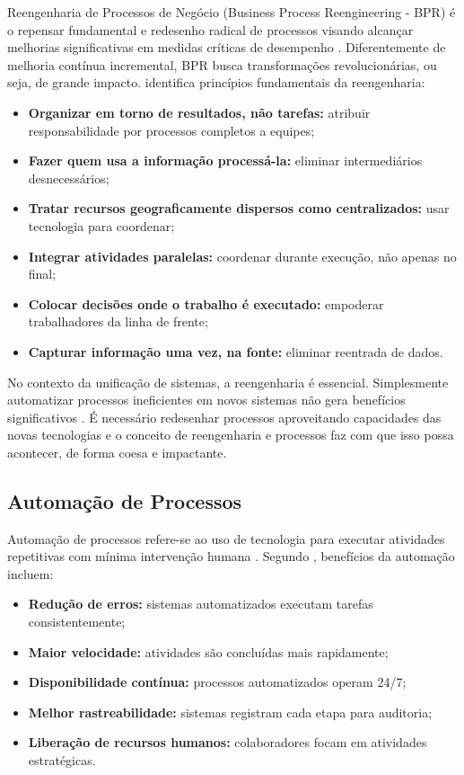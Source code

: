 Reengenharia de Processos de Negócio (Business Process Reengineering - BPR) é o repensar fundamental e redesenho radical de processos visando alcançar melhorias significativas em medidas críticas de desempenho \cite{hammer1993}. Diferentemente de melhoria contínua incremental, BPR busca transformações revolucionárias, ou seja, de grande impacto.
\cite{davenport1993} identifica princípios fundamentais da reengenharia:
\begin{itemize}
    \item \textbf{Organizar em torno de resultados, não tarefas:} atribuir responsabilidade por processos completos a equipes;
    \item \textbf{Fazer quem usa a informação processá-la:} eliminar intermediários desnecessários;
    \item \textbf{Tratar recursos geograficamente dispersos como centralizados:} usar tecnologia para coordenar;
    \item \textbf{Integrar atividades paralelas:} coordenar durante execução, não apenas no final;
    \item \textbf{Colocar decisões onde o trabalho é executado:} empoderar trabalhadores da linha de frente;
    \item \textbf{Capturar informação uma vez, na fonte:} eliminar reentrada de dados.
\end{itemize}
No contexto da unificação de sistemas, a reengenharia é essencial. Simplesmente automatizar processos ineficientes em novos sistemas não gera benefícios significativos \cite{hammer2001}. É necessário redesenhar processos aproveitando capacidades das novas tecnologias e o conceito de reengenharia e processos faz com que isso possa acontecer, de forma coesa e impactante.
\subsection{Automação de Processos}

Automação de processos refere-se ao uso de tecnologia para executar atividades repetitivas com mínima intervenção humana \cite{lacity2016}. Segundo \cite{vom2013}, benefícios da automação incluem:
\begin{itemize}
    \item \textbf{Redução de erros:} sistemas automatizados executam tarefas consistentemente;
    \item \textbf{Maior velocidade:} atividades são concluídas mais rapidamente;
    \item \textbf{Disponibilidade contínua:} processos automatizados operam 24/7;
    \item \textbf{Melhor rastreabilidade:} sistemas registram cada etapa para auditoria;
    \item \textbf{Liberação de recursos humanos:} colaboradores focam em atividades estratégicas.
\end{itemize}

